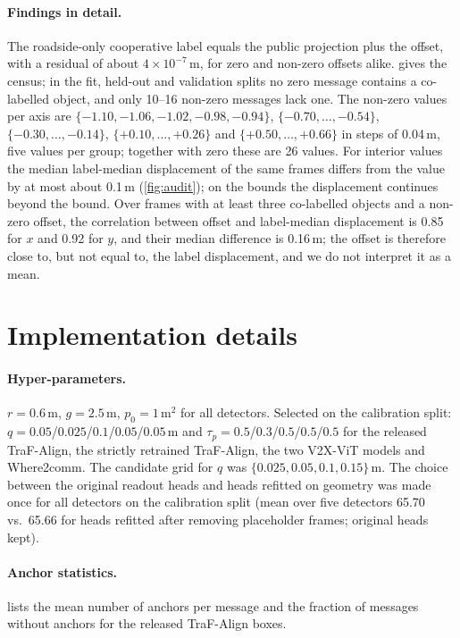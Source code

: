 \paragraph{Findings in detail.}
The roadside-only cooperative label equals the public projection plus the offset, with a residual of about $4\times10^{-7}$\,m, for zero and non-zero offsets alike.
 gives the census; in the fit, held-out and validation splits no zero message contains a co-labelled object, and only 10--16 non-zero messages lack one.
The non-zero values per axis are
$\{-1.10,-1.06,-1.02,-0.98,-0.94\}$, $\{-0.70,\dots,-0.54\}$, $\{-0.30,\dots,-0.14\}$, $\{+0.10,\dots,+0.26\}$ and $\{+0.50,\dots,+0.66\}$ in steps of 0.04\,m, five values per group; together with zero these are 26 values.
For interior values the median label-median displacement of the same frames differs from the value by at most about 0.1\,m (\cref{fig:audit}); on the bounds the displacement continues beyond the bound.
Over frames with at least three co-labelled objects and a non-zero offset, the correlation between offset and label-median displacement is 0.85 for $x$ and 0.92 for $y$, and their median difference is 0.16\,m; the offset is therefore close to, but not equal to, the label displacement, and we do not interpret it as a mean.

\section{Implementation details}
\label{app:impl}

\paragraph{Hyper-parameters.}
$r=0.6$\,m, $g=2.5$\,m, $p_0=1$\,m$^2$ for all detectors.
Selected on the calibration split: $q=0.05$/$0.025$/$0.1$/$0.05$/$0.05$\,m and $\tau_p=0.5$/$0.3$/$0.5$/$0.5$/$0.5$ for the released TraF-Align, the strictly retrained TraF-Align, the two V2X-ViT models and Where2comm.
The candidate grid for $q$ was $\{0.025,0.05,0.1,0.15\}$\,m.
The choice between the original readout heads and heads refitted on \method geometry was made once for all detectors on the calibration split (mean over five detectors 65.70 vs.\ 65.66 \apseven for heads refitted after removing placeholder frames; original heads kept).

\paragraph{Anchor statistics.}
 lists the mean number of anchors per message and the fraction of messages without anchors for the released TraF-Align boxes.

